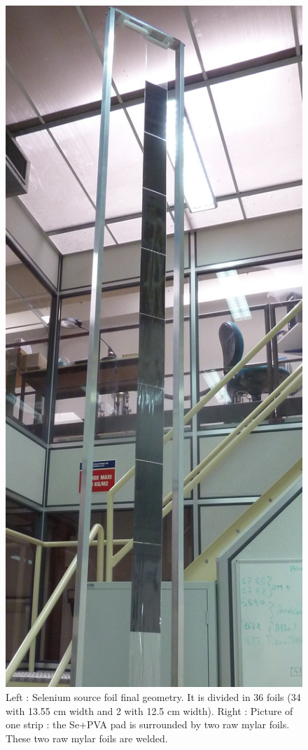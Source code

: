 \documentclass[main.tex]{subfiles}
\begin{document}
\begin{figure}[h!]
\begin{center}
\includegraphics[scale=0.075]{pictures/Chap3/P1090162.JPG}
\caption{Left : Selenium source foil final geometry. It is divided in 36 foils
(34 with 13.55 cm width and 2 with 12.5 cm width). Right : Picture of one strip : the Se+PVA pad is surrounded by two raw mylar foils. These two raw mylar foils are welded.} 
\label{SuperNEMOFoils}
\end{center}
\end{figure}
\end{document}
